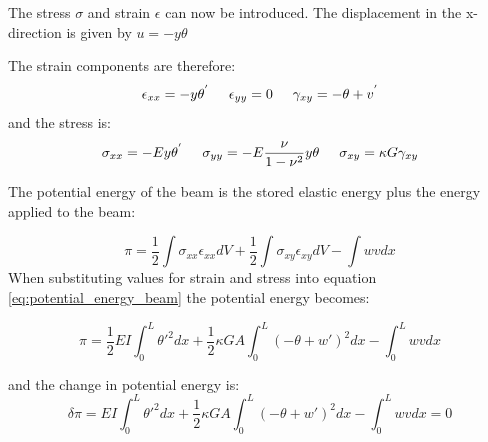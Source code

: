 \documentclass[]{report}
\begin{document}
 
The stress $\sigma$ and strain $\epsilon$ can now be introduced. The displacement in the x-direction is given by $u = -y \theta$
 
 The strain components are therefore: 
 \begin{equation}
\epsilon_{xx} = -y \theta ^{'}
\hspace{5 mm}
\epsilon_{yy} = 0
\label{eq:strain}
\hspace{5 mm}
\gamma_{xy} = -\theta + v^{'}
 \end{equation}
 and the stress is:
  \begin{equation}
 \sigma_{xx} = -E y \theta ^{'}
 \hspace{5 mm}
 \sigma_{yy} = -E \frac{\nu}{1 - \nu ^2} y \theta
 \label{eq:stress}
 \hspace{5 mm}
 \sigma_{xy} = \kappa G \gamma_{xy}
 \end{equation}
 
 The potential energy of the beam is the stored elastic energy plus the energy applied to the beam:
 
 \begin{equation}
 \pi = \frac{1}{2} \int \sigma_{xx} \epsilon_{xx} dV + \frac{1}{2} \int \sigma_{xy} \epsilon_{xy} dV  - \int w v dx
 \label{eq:potential_energy_beam}
 \end{equation}
 When substituting values for strain and stress into equation \ref{eq:potential_energy_beam} the potential energy becomes:
 
  
 \begin{equation}
 \pi = \frac{1}{2} E I  \int_{0}^{L} {\theta '}^2 dx + \frac{1}{2} \kappa G A  \int_{0}^{L} (-\theta + w')^2  dx  -  \int_{0}^{L} w v dx
 \label{eq:potential_energy_beam_sub}
 \end{equation}
 
 and the change in potential energy is:
  \begin{equation}
 \delta \pi =  E I  \int_{0}^{L} {\theta '}^2 dx + \frac{1}{2} \kappa G A  \int_{0}^{L} (-\theta + w')^2  dx  -  \int_{0}^{L} w v dx = 0
 \label{eq:potential_energy_beam_sub}
 \end{equation}
 
 
 
\end{document}
